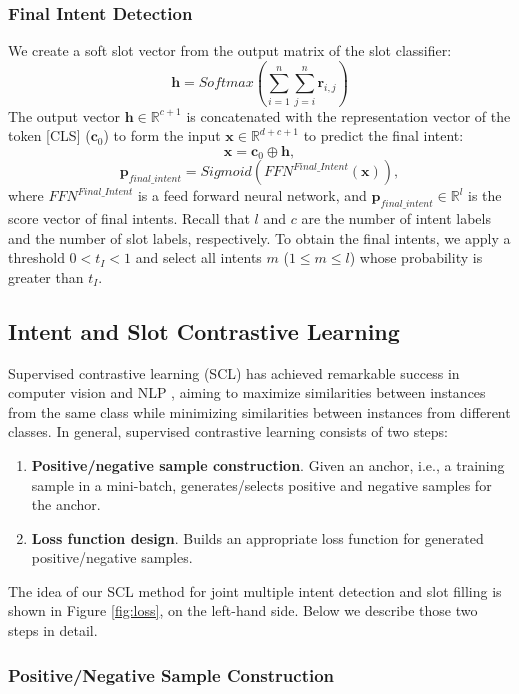 \documentclass{ecai}
\begin{document}
\subsubsection{Final Intent Detection}
We create a soft slot vector from the output matrix of the slot classifier: 
$$\textbf{h} = Softmax(\sum_{i=1}^n \sum_{j=i}^n \textbf{r}_{i,j})$$
The output vector $\textbf{h} \in \mathbb{R}^{c+1}$ is concatenated with the representation vector of the token [CLS] ($\textbf{c}_0$) to form the input $\textbf{x} \in \mathbb{R}^{d+c+1}$ to predict the final intent: 
$$\textbf{x} = \textbf{c}_0 \oplus \textbf{h},$$
$$\textbf{p}_{final\_intent}=Sigmoid(FFN^{Final\_Intent}(\textbf{x})),$$
where $FFN^{Final\_Intent}$ is a feed forward neural network, and $\textbf{p}_{final\_intent}\in \mathbb{R}^l$ is the score vector of final intents. Recall that $l$ and $c$ are the number of intent labels and the number of slot labels, respectively. To obtain the final intents, we apply a threshold $0 < t_I < 1$ and select all intents $m$ ($1 \leq m \leq l$) whose probability is greater than $t_I$.

\subsection{Intent and Slot Contrastive Learning }

Supervised contrastive learning (SCL) has achieved remarkable success in computer vision and NLP \cite{khosla:2020,zhang:2022,ZhangNAACL:2022,Rethmeier:2023}, aiming to maximize similarities between instances from the same class while minimizing similarities between instances from different classes. In general, supervised contrastive learning consists of two steps:
\begin{enumerate}
    \item \textbf{Positive/negative sample construction}. Given an anchor, i.e., a training sample in a mini-batch, generates/selects positive and negative samples for the anchor.
    \item \textbf{Loss function design}. Builds an appropriate loss function for generated positive/negative samples.  
\end{enumerate}

The idea of our SCL method for joint multiple intent detection and slot filling is shown in Figure \ref{fig:loss}, on the left-hand side. Below we describe those two steps in detail.  

\subsubsection{Positive/Negative Sample Construction}
\end{document}

